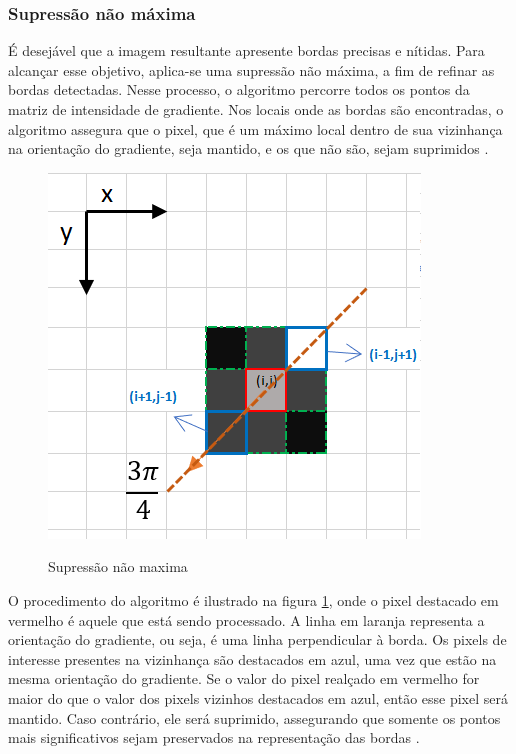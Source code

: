 \subsubsection[Supressão não máxima]{Supressão não máxima}

É desejável que a imagem resultante apresente bordas precisas e nítidas. Para alcançar esse objetivo, aplica-se uma supressão não máxima, a fim de refinar as bordas detectadas. Nesse processo, o algoritmo percorre todos os pontos da matriz de intensidade de gradiente. Nos locais onde as bordas são encontradas, o algoritmo assegura que o pixel, que é um máximo local dentro de sua vizinhança na orientação do gradiente, seja mantido, e os que não são, sejam suprimidos \cite{canny-edge-detection-python}.

\begin{figure}[!ht]
	\centering
    \caption{Supressão não maxima}
	\includegraphics[scale=0.65]{figuras/filter/supressao_nao_maxima/supressao3.png}
	\label{fig:Supressao nao maxima}
\end{figure}

O procedimento do algoritmo é ilustrado na figura \ref{fig:Supressao nao maxima}, onde o pixel destacado em vermelho é aquele que está sendo processado. A linha em laranja representa a orientação do gradiente, ou seja, é uma linha perpendicular à borda. Os pixels de interesse presentes na vizinhança são destacados em azul, uma vez que estão na mesma orientação do gradiente. Se o valor do pixel realçado em vermelho for maior do que o valor dos pixels vizinhos destacados em azul, então esse pixel será mantido. Caso contrário, ele será suprimido, assegurando que somente os pontos mais significativos sejam preservados na representação das bordas \cite{canny-edge-detection-python}.


